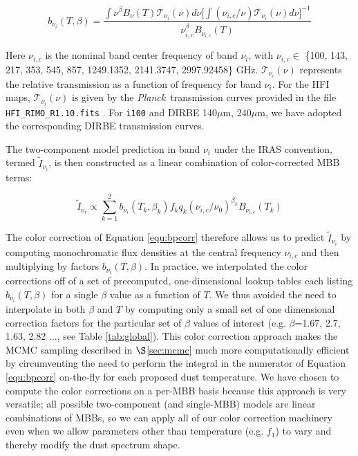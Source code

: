 \documentclass{emulateapj}
\newcommand{\PLANCK}{{\it Planck}}
\begin{document}
\begin{equation} \label{equ:bpcorr}
b_{\nu_i}(T, \beta) = \frac{\int \nu^{\beta}B_{\nu}(T)\mathcal{T}_{\nu_i}(\nu) d\nu \bigg[\int (\nu_{i,c}/\nu)\mathcal{T}_{\nu_i}(\nu) d\nu\bigg]^{-1}}{\nu_{i,c}^{\beta}B_{\nu_{i,c}}(T)}
\end{equation}

Here $\nu_{i,c}$ is the nominal band center frequency of band $\nu_i$,  with 
$\nu_{i,c} \in$ \{100, 143, 217, 353, 545, 857, 1249.1352, 2141.3747, 
2997.92458\} GHz. $\mathcal{T}_{\nu_i}(\nu)$ represents the relative 
transmission as a function of frequency for band $\nu_i$. For the HFI maps, 
$\mathcal{T}_{\nu_i}(\nu)$ is given by the \PLANCK~transmission curves provided
in the file \verb|HFI_RIMO_R1.10.fits| \citep{planckresponse}. For \verb|i100| 
and DIRBE 140$\mu$m, 240$\mu$m, we have adopted the corresponding DIRBE 
transmission curves. 

The two-component model prediction in band $\nu_i$ under the IRAS convention, 
termed $\tilde{I}_{\nu_i}$, is then constructed as a linear combination of 
color-corrected MBB terms:

\begin{equation} \label{equ:iras}
\tilde{I}_{\nu_i} \propto \sum_{k=1}^{2} b_{\nu_i}(T_k, \beta_k) f_k q_k (\nu_{i,c}/\nu_0)^{\beta_k} B_{\nu_{i,c}}(T_k)
\end{equation}

The color correction of Equation \ref{equ:bpcorr} therefore allows us to 
predict $\tilde{I}_{\nu_i}$ by computing monochromatic flux densities at the 
central frequency $\nu_{i,c}$ and then multiplying by factors 
$b_{\nu_i}(T, \beta)$. In practice, we interpolated the color corrections off 
of a set of precomputed, one-dimensional lookup tables each listing 
$b_{\nu_i}(T, \beta)$ for a single $\beta$ value as a function of $T$. We thus
avoided the need to interpolate in both $\beta$ and $T$ by computing only a 
small set of one dimensional correction factors for the particular set of 
$\beta$ values of interest (e.g. $\beta$=1.67, 2.7, 1.63, 2.82 ..., see Table 
\ref{tab:global}). This color correction approach makes the MCMC sampling 
described in $\S$\ref{sec:mcmc} much more computationally efficient by 
circumventing the need to perform the integral in the numerator of Equation 
\ref{equ:bpcorr} on-the-fly for each proposed dust temperature. We have chosen 
to compute the color corrections on a per-MBB basis because this approach is 
very versatile; all possible two-component (and single-MBB) models are linear 
combinations of MBBs, so we can apply all of our color correction machinery 
even when we allow parameters other than temperature (e.g. $f_1$) to vary and 
thereby modify the dust spectrum shape.
\end{document}
